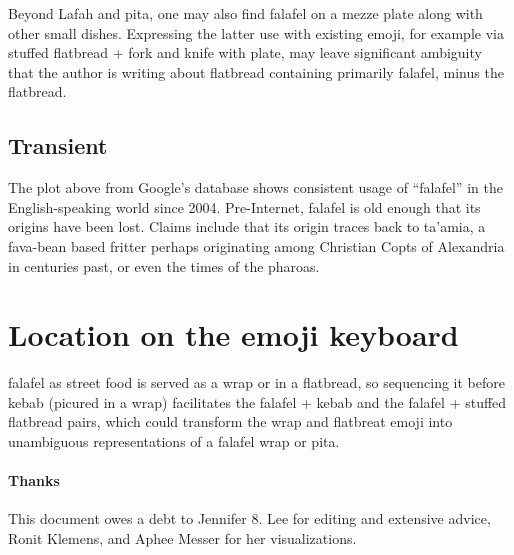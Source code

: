 \documentclass[a4paper,10pt]{article}
\begin{document}
Beyond Lafah and pita, one may also find falafel on a mezze plate along with other small
dishes. Expressing the latter use with existing emoji, for example via
{\sc stuffed flatbread + fork and knife with plate}, may leave significant ambiguity that
the author is writing about flatbread containing primarily falafel, minus the flatbread.

\subsection{Transient}

The plot above from Google's database shows consistent usage of ``falafel'' in the
English-speaking world since 2004. Pre-Internet, falafel is old enough that its origins
have been lost. Claims include that its origin traces back to ta'amia, a fava-bean
based fritter perhaps originating among Christian Copts of Alexandria in centuries past,
or even the times of the pharoas.


\section{Location on the emoji keyboard}

{\sc falafel} as street food is served as a wrap or in a flatbread, so sequencing it before {\sc kebab}
(picured in a wrap) facilitates the {\sc falafel} + {\sc kebab} and the {\sc falafel}
+ {\sc stuffed flatbread} pairs, which could transform the wrap and flatbreat emoji
into unambiguous representations of a falafel wrap or pita.

\vfill
\paragraph{Thanks} This document owes a debt to Jennifer 8. Lee for editing and extensive
advice, Ronit Klemens, and Aphee Messer for her visualizations.
\end{document}
